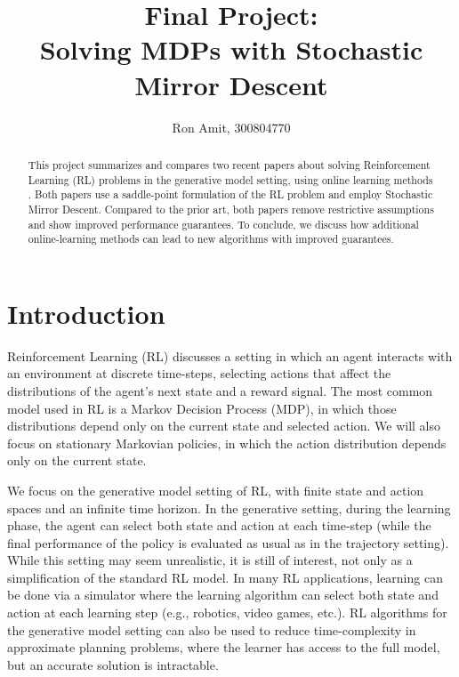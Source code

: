 \documentclass{article}
\title{Final Project: \\ 
Solving MDPs with Stochastic Mirror Descent}
\author{Ron Amit, 300804770 }
\begin{document}
\maketitle

\begin{abstract}
    This project summarizes and compares two recent papers \citep{cheng2020reduction, jin20efficiently} about solving Reinforcement Learning (RL) problems in the generative model setting, using online learning methods .
    Both papers use a saddle-point formulation of the RL problem and employ Stochastic Mirror Descent.
    Compared to the prior art, both papers remove restrictive assumptions and show improved performance guarantees. 
    To conclude, we discuss how additional online-learning methods can lead to new algorithms with improved guarantees. 
\end{abstract}

\section{Introduction}

Reinforcement Learning (RL) discusses a setting in which an agent interacts with an environment at discrete time-steps, selecting actions that affect the distributions of the agent's next state and a reward signal.
The most common model used in RL is a Markov Decision Process (MDP), in which those distributions depend only on the current state and selected action.
We will also focus on stationary Markovian policies, in which the action distribution depends only on the current state.

We focus on the generative model setting of RL, with finite state and action spaces and an infinite time horizon.
In the generative setting, during the learning phase, the agent can select both state and action at each time-step (while the final performance of the policy is evaluated as usual as in the trajectory setting).
While this setting may seem unrealistic, it is still of interest, not only as a simplification of the standard RL model. 
In many RL applications, learning can be done via a simulator where the learning algorithm can select both state and action at each learning step (e.g., robotics, video games, etc.).
RL algorithms for the generative model setting can also be used to reduce time-complexity in approximate planning problems, where the learner has access to the full model, but an accurate solution is intractable.
\end{document}
